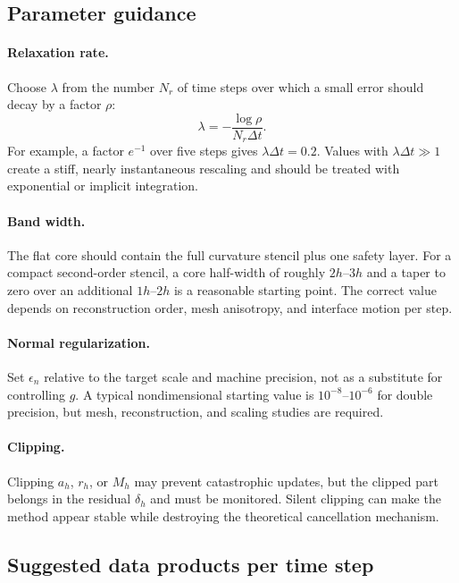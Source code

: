\documentclass[11pt,a4paper]{article}
\theoremstyle{definition}
\theoremstyle{remark}
\begin{document}
\subsection{Parameter guidance}

\paragraph{Relaxation rate.}
Choose $\lambda$ from the number $N_r$ of time steps over which a small error should decay by a factor $\rho$:
\begin{equation}
  \lambda=-\frac{\log\rho}{N_r\Delta t}.
  \label{eq:lambda-choice}
\end{equation}
For example, a factor $e^{-1}$ over five steps gives $\lambda\Delta t=0.2$. Values with $\lambda\Delta t\gg1$ create a stiff, nearly instantaneous rescaling and should be treated with exponential or implicit integration.

\paragraph{Band width.}
The flat core should contain the full curvature stencil plus one safety layer. For a compact second-order stencil, a core half-width of roughly $2h$--$3h$ and a taper to zero over an additional $1h$--$2h$ is a reasonable starting point. The correct value depends on reconstruction order, mesh anisotropy, and interface motion per step.

\paragraph{Normal regularization.}
Set $\epsilon_n$ relative to the target scale and machine precision, not as a substitute for controlling $g$. A typical nondimensional starting value is $10^{-8}$--$10^{-6}$ for double precision, but mesh, reconstruction, and scaling studies are required.

\paragraph{Clipping.}
Clipping $a_h$, $r_h$, or $M_h$ may prevent catastrophic updates, but the clipped part belongs in the residual $\delta_h$ and must be monitored. Silent clipping can make the method appear stable while destroying the theoretical cancellation mechanism.

\subsection{Suggested data products per time step}
\end{document}
